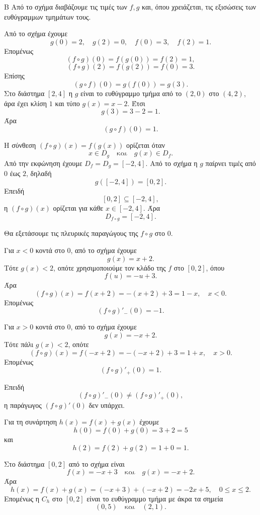 

\begin{thema}{Β}
Από το σχήμα διαβάζουμε τις τιμές των $f,g$ και, όπου χρειάζεται, τις εξισώσεις των ευθύγραμμων τμημάτων τους.

\begin{erwthma}
\item Από το σχήμα έχουμε
\[
g(0)=2,\quad g(2)=0,\quad f(0)=3,\quad f(2)=1.
\]
Επομένως
\[
(f\circ g)(0)=f(g(0))=f(2)=1,
\]
\[
(f\circ g)(2)=f(g(2))=f(0)=3.
\]
Επίσης
\[
(g\circ f)(0)=g(f(0))=g(3).
\]
Στο διάστημα $[2,4]$ η $g$ είναι το ευθύγραμμο τμήμα από το $(2,0)$ στο $(4,2)$, άρα έχει κλίση $1$ και τύπο $g(x)=x-2$. Έτσι
\[
g(3)=3-2=1.
\]
Άρα
\[
(g\circ f)(0)=1.
\]

\item Η σύνθεση $(f\circ g)(x)=f(g(x))$ ορίζεται όταν
\[
x\in D_g
\quad\text{και}\quad
g(x)\in D_f.
\]
Από την εκφώνηση έχουμε $D_f=D_g=[-2,4]$. Από το σχήμα η $g$ παίρνει τιμές από $0$ έως $2$, δηλαδή
\[
g([-2,4])=[0,2].
\]
Επειδή
\[
[0,2]\subseteq[-2,4],
\]
η $(f\circ g)(x)$ ορίζεται για κάθε $x\in[-2,4]$. Άρα
\[
D_{f\circ g}=[-2,4].
\]

\item Θα εξετάσουμε τις πλευρικές παραγώγους της $f\circ g$ στο $0$.

Για $x<0$ κοντά στο $0$, από το σχήμα έχουμε
\[
g(x)=x+2.
\]
Τότε $g(x)<2$, οπότε χρησιμοποιούμε τον κλάδο της $f$ στο $[0,2]$, όπου
\[
f(u)=-u+3.
\]
Άρα
\[
(f\circ g)(x)=f(x+2)=-(x+2)+3=1-x,\quad x<0.
\]
Επομένως
\[
(f\circ g)'_-(0)=-1.
\]

Για $x>0$ κοντά στο $0$, από το σχήμα έχουμε
\[
g(x)=-x+2.
\]
Τότε πάλι $g(x)<2$, οπότε
\[
(f\circ g)(x)=f(-x+2)=-(-x+2)+3=1+x,\quad x>0.
\]
Επομένως
\[
(f\circ g)'_+(0)=1.
\]

Επειδή
\[
(f\circ g)'_-(0)\neq (f\circ g)'_+(0),
\]
η παράγωγος $(f\circ g)'(0)$ δεν υπάρχει.

\item Για τη συνάρτηση $h(x)=f(x)+g(x)$ έχουμε
\[
h(0)=f(0)+g(0)=3+2=5
\]
και
\[
h(2)=f(2)+g(2)=1+0=1.
\]

Στο διάστημα $[0,2]$ από το σχήμα είναι
\[
f(x)=-x+3
\quad\text{και}\quad
g(x)=-x+2.
\]
Άρα
\[
h(x)=f(x)+g(x)=(-x+3)+(-x+2)=-2x+5,\quad 0\leq x\leq 2.
\]
Επομένως η $C_h$ στο $[0,2]$ είναι το ευθύγραμμο τμήμα με άκρα τα σημεία
\[
(0,5)\quad\text{και}\quad (2,1).
\]
\end{erwthma}
\end{thema}

